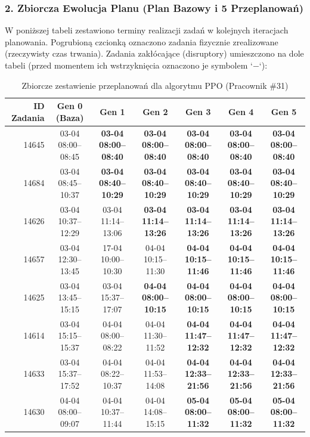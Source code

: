 \subsubsection*{2. Zbiorcza Ewolucja Planu (Plan Bazowy i 5 Przeplanowań)}

W poniższej tabeli zestawiono terminy realizacji zadań w kolejnych iteracjach planowania. Pogrubioną czcionką oznaczono zadania fizycznie zrealizowane (rzeczywisty czas trwania). Zadania zakłócające (disruptory) umieszczono na dole tabeli (przed momentem ich wstrzyknięcia oznaczono je symbolem `$-$`):

\begin{table}[htbp]
\centering\scriptsize
\caption{Zbiorcze zestawienie przeplanowań dla algorytmu PPO (Pracownik \#31)}
\label{tab:case_study_evolution_ppo_u31}
\begin{tabular}{|r|c|c|c|c|c|c|}
\hline
\textbf{ID Zadania} & \textbf{Gen 0 (Baza)} & \textbf{Gen 1} & \textbf{Gen 2} & \textbf{Gen 3} & \textbf{Gen 4} & \textbf{Gen 5} \\ \hline
14645 & 03-04 08:00--08:45 & \textbf{03-04 08:00--08:40} & \textbf{03-04 08:00--08:40} & \textbf{03-04 08:00--08:40} & \textbf{03-04 08:00--08:40} & \textbf{03-04 08:00--08:40} \\ 
14684 & 03-04 08:45--10:37 & \textbf{03-04 08:40--10:29} & \textbf{03-04 08:40--10:29} & \textbf{03-04 08:40--10:29} & \textbf{03-04 08:40--10:29} & \textbf{03-04 08:40--10:29} \\ 
14626 & 03-04 10:37--12:29 & 03-04 11:14--13:06 & \textbf{03-04 11:14--13:26} & \textbf{03-04 11:14--13:26} & \textbf{03-04 11:14--13:26} & \textbf{03-04 11:14--13:26} \\ 
14657 & 03-04 12:30--13:45 & 17-04 10:00--10:30 & 04-04 10:15--11:30 & \textbf{04-04 10:15--11:46} & \textbf{04-04 10:15--11:46} & \textbf{04-04 10:15--11:46} \\ 
14625 & 03-04 13:45--15:15 & 03-04 15:37--17:07 & \textbf{04-04 08:00--10:15} & \textbf{04-04 08:00--10:15} & \textbf{04-04 08:00--10:15} & \textbf{04-04 08:00--10:15} \\ 
14614 & 03-04 15:15--15:37 & 04-04 08:00--08:22 & 04-04 11:30--11:52 & \textbf{04-04 11:47--12:32} & \textbf{04-04 11:47--12:32} & \textbf{04-04 11:47--12:32} \\ 
14633 & 03-04 15:37--17:52 & 04-04 08:22--10:37 & 04-04 11:53--14:08 & \textbf{04-04 12:33--21:56} & \textbf{04-04 12:33--21:56} & \textbf{04-04 12:33--21:56} \\ 
14630 & 04-04 08:00--09:07 & 04-04 10:37--11:44 & 04-04 14:08--15:15 & \textbf{05-04 08:00--11:32} & \textbf{05-04 08:00--11:32} & \textbf{05-04 08:00--11:32} \\ 

\end{tabular}
\end{table}

